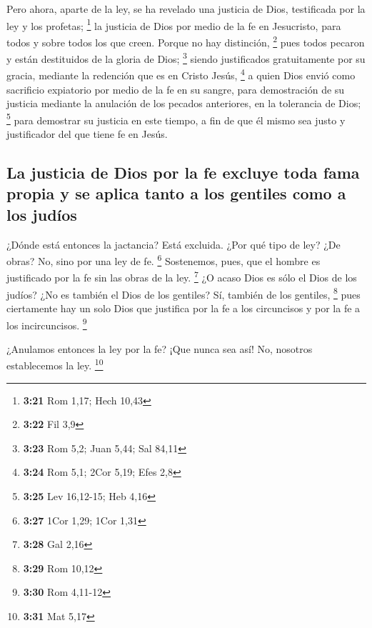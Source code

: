 \begin{paracol}{2}
 Pero ahora, aparte de la ley, se ha revelado una
justicia de Dios, testificada por la ley y los profetas; \footnote{\textbf{3:21}
  Rom 1,17; Hech 10,43}  la justicia de Dios por medio de
la fe en Jesucristo, para todos y sobre todos los que creen. Porque no
hay distinción, \footnote{\textbf{3:22} Fil 3,9}  pues
todos pecaron y están destituidos de la gloria de Dios; \footnote{\textbf{3:23}
  Rom 5,2; Juan 5,44; Sal 84,11}  siendo justificados
gratuitamente por su gracia, mediante la redención que es en Cristo
Jesús, \footnote{\textbf{3:24} Rom 5,1; 2Cor 5,19; Efes 2,8}
 a quien Dios envió como sacrificio expiatorio por medio
de la fe en su sangre, para demostración de su justicia mediante la
anulación de los pecados anteriores, en la tolerancia de Dios;
\footnote{\textbf{3:25} Lev 16,12-15; Heb 4,16}  para
demostrar su justicia en este tiempo, a fin de que él mismo sea justo y
justificador del que tiene fe en Jesús.

\hypertarget{la-justicia-de-dios-por-la-fe-excluye-toda-fama-propia-y-se-aplica-tanto-a-los-gentiles-como-a-los-juduxedos}{%
\subsection{La justicia de Dios por la fe excluye toda fama propia y se
aplica tanto a los gentiles como a los
judíos}\label{la-justicia-de-dios-por-la-fe-excluye-toda-fama-propia-y-se-aplica-tanto-a-los-gentiles-como-a-los-juduxedos}}

 ¿Dónde está entonces la jactancia? Está excluida. ¿Por
qué tipo de ley? ¿De obras? No, sino por una ley de fe. \footnote{\textbf{3:27}
  1Cor 1,29; 1Cor 1,31}  Sostenemos, pues, que el hombre
es justificado por la fe sin las obras de la ley. \footnote{\textbf{3:28}
  Gal 2,16}  ¿O acaso Dios es sólo el Dios de los judíos?
¿No es también el Dios de los gentiles? Sí, también de los gentiles,
\footnote{\textbf{3:29} Rom 10,12}  pues ciertamente hay
un solo Dios que justifica por la fe a los circuncisos y por la fe a los
incircuncisos. \footnote{\textbf{3:30} Rom 4,11-12}

 ¿Anulamos entonces la ley por la fe? ¡Que nunca sea así!
No, nosotros establecemos la ley. \footnote{\textbf{3:31} Mat 5,17}

\switchcolumn
\begin{otherlanguage}{english}


\end{otherlanguage}
\end{paracol}
